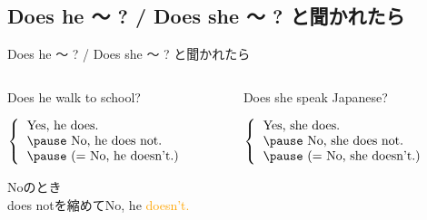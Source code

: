 \documentclass[aspectratio=169]{beamer}
\newcommand{\myaudio}[1]{\href{#1}{\faVolumeUp}}
\begin{document}
\subsection{Does he 〜 ?  / Does she 〜 ? と聞かれたら}

\begin{frame}[plain]{Does he  〜 ? / Does she 〜 ? と聞かれたら}
 \Large


\begin{columns}[t]
\begin{column}{.475\textwidth}
Does he walk to school?

\vspace{20pt}

\pause

\mbox{}\hspace{40pt}$\left\{\begin{tabular}{l}
         \text{Yes, he does.}\\\pause
         \text{No, he does not.}\\\pause
         \text{(}= \text{No, he doesn't.)}\\
       \end{tabular}\right.$

\pause

\vspace{10pt}

{\small Noのとき\\[-5pt]does notを縮めてNo, he \textcolor{orange}{doesn't.}}

\end{column}
\pause
\begin{column}{.475\textwidth}
Does she speak Japanese?

\vspace{20pt}

\pause

\mbox{}\hspace{40pt}$\left\{\begin{tabular}{l}
         \text{Yes, she does.}\\\pause
         \text{No, she does not.}\\\pause
           \text{(}= \text{No, she doesn't.)}
       \end{tabular}\right.$


\pause

\vspace{20pt}
\mbox{}\hfill\myaudio{./audio/011_answer_be_do.mp3}\,\,{}

\end{column}
\end{columns}

\end{frame}
\end{document}
